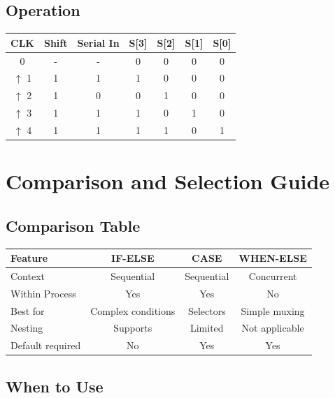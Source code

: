 \documentclass[12pt,a4paper]{article}
\begin{document}
\subsection{Operation}

\begin{table}[h]
\centering
\begin{tabular}{|c|c|c|c|c|c|c|}
\hline
\textbf{CLK} & \textbf{Shift} & \textbf{Serial In} & \textbf{S[3]} & \textbf{S[2]} & \textbf{S[1]} & \textbf{S[0]} \\
\hline
0 & - & - & 0 & 0 & 0 & 0 \\
\hline
$\uparrow$ 1 & 1 & 1 & 1 & 0 & 0 & 0 \\
\hline
$\uparrow$ 2 & 1 & 0 & 0 & 1 & 0 & 0 \\
\hline
$\uparrow$ 3 & 1 & 1 & 1 & 0 & 1 & 0 \\
\hline
$\uparrow$ 4 & 1 & 1 & 1 & 1 & 0 & 1 \\
\hline
\end{tabular}
\end{table}

\newpage
\section{Comparison and Selection Guide}

\subsection{Comparison Table}

\begin{table}[h]
\centering
\begin{tabular}{|l|c|c|c|}
\hline
\textbf{Feature} & \textbf{IF-ELSE} & \textbf{CASE} & \textbf{WHEN-ELSE} \\
\hline
Context & Sequential & Sequential & Concurrent \\
\hline
Within Process & Yes & Yes & No \\
\hline
Best for & Complex conditions & Selectors & Simple muxing \\
\hline
Nesting & Supports & Limited & Not applicable \\
\hline
Default required & No & Yes & Yes \\
\hline
\end{tabular}
\end{table}

\subsection{When to Use}
\end{document}
